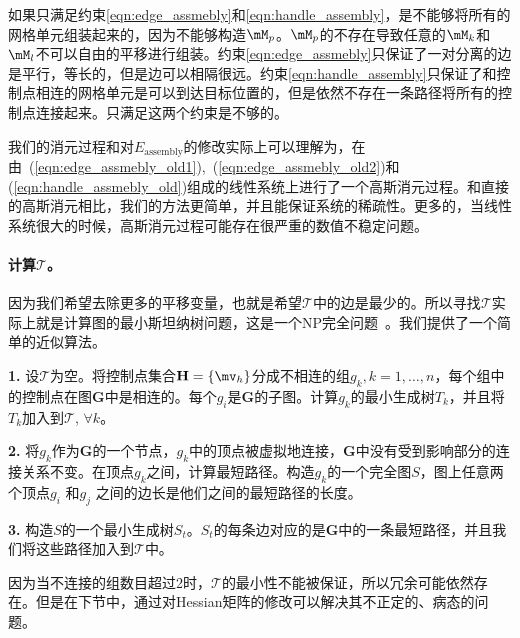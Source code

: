 如果只满足约束\ref{eqn:edge_assmebly}和\ref{eqn:handle_assembly}，是不能够将所有的网格单元组装起来的，因为不能够构造$\mM_p$。$\mM_p$的不存在导致任意的$\mM_k$和$\mM_l$不可以自由的平移进行组装。约束\ref{eqn:edge_assmebly}只保证了一对分离的边是平行，等长的，但是边可以相隔很远。约束\ref{eqn:handle_assembly}只保证了和控制点相连的网格单元是可以到达目标位置的，但是依然不存在一条路径将所有的控制点连接起来。只满足这两个约束是不够的。

我们的消元过程和对$E_\textrm{assembly}$的修改实际上可以理解为，在由~(\ref{eqn:edge_assmebly_old1}),~(\ref{eqn:edge_assmebly_old2})和(\ref{eqn:handle_assmebly_old})组成的线性系统上进行了一个高斯消元过程。和直接的高斯消元相比，我们的方法更简单，并且能保证系统的稀疏性。更多的，当线性系统很大的时候，高斯消元过程可能存在很严重的数值不稳定问题。

\paragraph{计算$\mathcal{T}$。} 因为我们希望去除更多的平移变量，也就是希望$\mathcal{T}$中的边是最少的。所以寻找$\mathcal{T}$实际上就是计算图的最小斯坦纳树问题，这是一个NP完全问题~\cite{Ivanov1994}。我们提供了一个简单的近似算法。

\textbf{1.} 设$\mathcal{T}$为空。将控制点集合$\mathbf{H} = \{\mv_h\}$分成不相连的组$g_k, k=1,\ldots,n$，每个组中的控制点在图$\mathbf{G}$中是相连的。每个$g_i$是$\mathbf{G}$的子图。计算$g_k$的最小生成树$T_k$，并且将$T_k$加入到$\mathcal{T}$, $\forall k$。

\textbf{2.} 将$g_k$作为$\mathbf{G}$的一个节点，$g_k$中的顶点被虚拟地连接，$\mathbf{G}$中没有受到影响部分的连接关系不变。在顶点$g_k$之间，计算最短路径。构造$g_k$的一个完全图$S$，图上任意两个顶点$g_i$ 和$g_j$ 之间的边长是他们之间的最短路径的长度。

\textbf{3.} 构造$S$的一个最小生成树$S_t$。$S_t$的每条边对应的是$\mathbf{G}$中的一条最短路径，并且我们将这些路径加入到$\mathcal{T}$中。

因为当不连接的组数目超过2时，$\mathcal{T}$的最小性不能被保证，所以冗余可能依然存在。但是在下节中，通过对Hessian矩阵的修改可以解决其不正定的、病态的问题。

